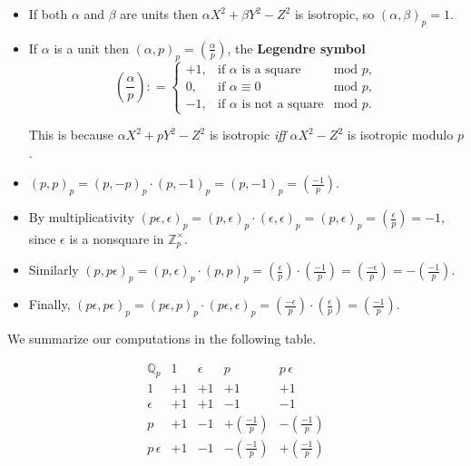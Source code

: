 \documentclass{article}
\newcommand{\term}{\textbf}
\newcommand{\legendre}[2]{\left(\frac{#1}{#2}\right)}
\newcommand{\dfn}{\mathrel{\mathop:}=}
\newcommand{\ZZ}{\mathbb{Z}}
\newcommand{\QQ}{\mathbb{Q}}
\theoremstyle{myplain}
\theoremstyle{mydefinition}
\begin{document}
\begin{itemize}
\item If both $\alpha$ and $\beta$ are units then $\alpha X^2 + \beta Y^2 - Z^2$
  is isotropic, so $(\alpha,\beta)_p = 1$.

\item If $\alpha$ is a unit then $(\alpha, p)_p = \legendre{\alpha}{p}$, the
  \term{Legendre symbol}
  \[ \legendre{\alpha}{p} \dfn
    \left\{\begin{array}{rll}
             +1, & \text{if } \alpha \text{ is a square} & \text{mod }p, \\
             0, & \text{if } \alpha\equiv 0 & \text{mod }p, \\
             -1, & \text{if } \alpha \text{ is not a square} & \text{mod }p.
           \end{array}\right. \]

  This is because $\alpha X^2 + p Y^2 - Z^2$ is isotropic \emph{iff}
  $\alpha X^2 - Z^2$ is isotropic modulo $p$.

\item $(p,p)_p = (p, -p)_p \cdot (p, -1)_p = (p, -1)_p = \legendre{-1}{p}$.

\item By multiplicativity
  $(p\epsilon, \epsilon)_p = (p,\epsilon)_p \cdot (\epsilon, \epsilon)_p =
  (p,\epsilon)_p = \legendre{\epsilon}{p} = -1$, since $\epsilon$ is a nonsquare
  in $\ZZ_p^\times$.

\item Similarly
  $(p, p\epsilon)_p = (p,\epsilon)_p \cdot (p,p)_p = \legendre{\epsilon}{p}
  \cdot \legendre{-1}{p} = \legendre{-\epsilon}{p} = - \legendre{-1}{p}$.

\item Finally,
  $(p\epsilon, p\epsilon)_p = (p\epsilon, p)_p \cdot (p\epsilon, \epsilon)_p =
  \legendre{-\epsilon}{p} \cdot \legendre{\epsilon}{p} = \legendre{-1}{p}$.
\end{itemize}

We summarize our computations in the following table.

\[ \begin{array}{c|cccc}
     \QQ_p & 1 & \epsilon & p & p\,\epsilon \\
     \hline
     1 & +1 & +1 & +1 & +1 \\
     \epsilon & +1 & +1 & -1 & -1 \\
     p & +1 & -1 & +\legendre{-1}{p} & -\legendre{-1}{p} \\
     p\,\epsilon & +1 & -1 & -\legendre{-1}{p} & +\legendre{-1}{p}
   \end{array} \]
\end{document}
